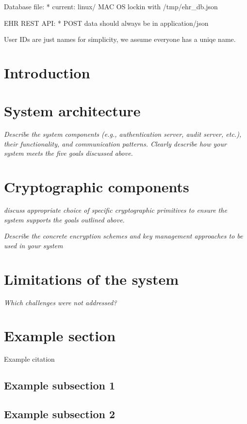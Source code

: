 \documentclass[11pt]{article}
\begin{document}
\begin{flushleft}
		Database file:
		* current: linux/ MAC OS lockin with /tmp/ehr_db.json

		EHR REST API:
		* POST data should always be in application/json

		User IDs are just names for simplicity, we assume everyone has a uniqe name.
		
		\section{Introduction}

		\section{System architecture}

		\textit{Describe the system components (e.g., authentication server, audit server, etc.), their functionality, and communication patterns. Clearly describe how your system meets the five goals discussed above.}

		\section{Cryptographic components}

		\textit{discuss appropriate choice of specific cryptographic primitives to ensure the system supports the goals outlined above.}

		\textit{Describe the concrete encryption schemes and key management approaches to be used in your system}

		\section{Limitations of the system}

		\textit{Which challenges were not addressed?}
		
		\section{Example section}
		
		Example citation \cite{neuman2009challenges}
		
		\subsection{Example subsection 1}
		
		\subsection{Example subsection 2}
		
		\newpage
		
		
		
		
		
		
	\end{flushleft}
	
\end{document}
